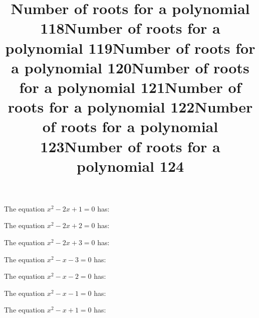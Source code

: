 \documentclass{article}
\begin{document}
\begin{category}
\begin{question}[multichoice]
\end{question}
\begin{question}[multichoice]
\title{Number of roots for a polynomial 118}
The equation $x^{2} - 2 x + 1=0$ has:



\end{question}
\begin{question}[multichoice]
\title{Number of roots for a polynomial 119}
The equation $x^{2} - 2 x + 2=0$ has:



\end{question}
\begin{question}[multichoice]
\title{Number of roots for a polynomial 120}
The equation $x^{2} - 2 x + 3=0$ has:



\end{question}
\begin{question}[multichoice]
\title{Number of roots for a polynomial 121}
The equation $x^{2} - x - 3=0$ has:



\end{question}
\begin{question}[multichoice]
\title{Number of roots for a polynomial 122}
The equation $x^{2} - x - 2=0$ has:



\end{question}
\begin{question}[multichoice]
\title{Number of roots for a polynomial 123}
The equation $x^{2} - x - 1=0$ has:



\end{question}
\begin{question}[multichoice]
\title{Number of roots for a polynomial 124}
The equation $x^{2} - x + 1=0$ has:


\end{question}
\end{category}
\end{document}
